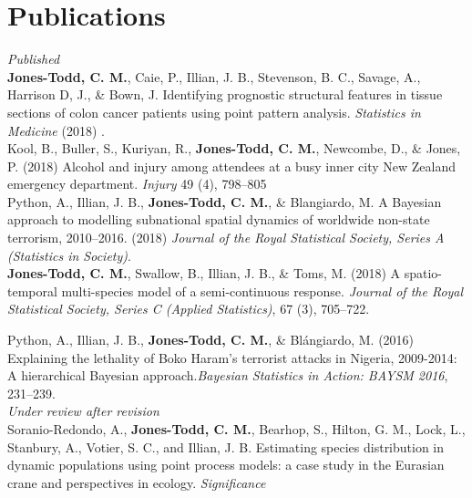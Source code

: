 \documentclass[10pt,a4paper]{moderncv}
\begin{document}
  \section{Publications}
  \vspace{5pt}

  \textit{\small{Published}}\\
  
\vspace{-3pt}
\textbf{Jones-Todd, C. M.}, Caie, P., Illian, J. B., Stevenson, B. C., Savage, A., Harrison D, J., \& Bown, J. Identifying prognostic structural features in tissue sections of colon cancer patients using point pattern analysis. \textit{Statistics in Medicine} (2018)  .\\


\vspace{-3pt}
Kool, B., Buller, S., Kuriyan, R., \textbf{Jones-Todd, C. M.}, Newcombe, D., \& Jones, P. (2018) Alcohol and injury among attendees at a busy inner city New Zealand emergency department. \textit{Injury} 49 (4), 798--805\\


\vspace{-3pt}
Python, A.,  Illian, J. B., \textbf{Jones-Todd, C. M.}, \& Blangiardo, M. A Bayesian approach to modelling subnational spatial dynamics of worldwide non-state terrorism, 2010--2016. (2018) \textit{Journal of the Royal Statistical Society, Series  A (Statistics in Society)}.\\

  \textbf{Jones-Todd, C. M.}, Swallow, B., Illian, J. B., \& Toms, M. (2018) A spatio-temporal multi-species model of a semi-continuous response. \textit{Journal of the Royal Statistical Society, Series C (Applied Statistics)}, 67 (3), 705--722.\\
\vspace{5pt}

\vspace{-3pt}
Python, A.,  Illian, J. B., \textbf{Jones-Todd, C. M.}, \& Bl\'{a}ngiardo, M. (2016) Explaining the lethality of Boko Haram’s terrorist attacks in Nigeria, 2009-2014: A hierarchical Bayesian approach.\textit{Bayesian Statistics in Action: BAYSM 2016}, 231--239.\\


\textit{\small{Under review after revision}}\\

\vspace{-3pt}
Soranio-Redondo, A., \textbf{Jones-Todd, C. M.}, Bearhop, S., Hilton, G. M., Lock, L., Stanbury, A., Votier, S. C., and Illian, J. B. Estimating species distribution in dynamic populations using point process models: a case study in the Eurasian crane and perspectives in ecology. \textit{Significance}\\
\end{document}
